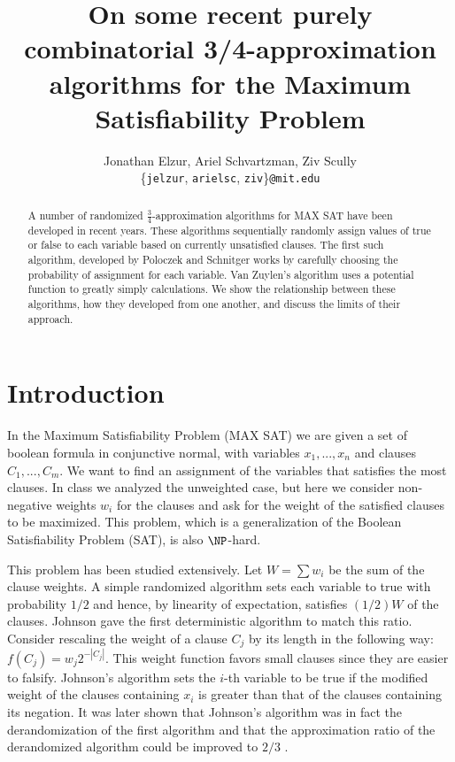 \documentclass[11pt,letter]{article}
\numberwithin{theorem}{section}
\begin{document}

\title{On some recent purely combinatorial 3/4-approximation algorithms for the Maximum Satisfiability Problem}

\author{Jonathan Elzur, Ariel Schvartzman, Ziv Scully \\
  \{\texttt{jelzur}, \texttt{arielsc}, \texttt{ziv}\}\texttt{@mit.edu}}

\maketitle
\begin{abstract}
A number of randomized $\frac{3}{4}$-approximation algorithms for MAX SAT have been developed in recent years. These algorithms sequentially randomly assign values of true or false to each variable based on currently unsatisfied clauses. The first such algorithm, developed by Poloczek and Schnitger \cite{Poloczek:2011:RVJ:2133036.2133087} works by carefully choosing the probability of assignment for each variable. Van Zuylen's algorithm \cite{vanZuylen:2011:SAM:2238496.2238512} uses a potential function to greatly simply calculations. We show the relationship between these algorithms, how they developed from one another, and discuss the limits of their approach.
\end{abstract}

\section{Introduction}

In the Maximum Satisfiability Problem (MAX SAT) we are given a set of boolean formula in conjunctive normal, with
variables $x_1, ..., x_n$ and clauses $C_1,...,C_m$. We want to find an
assignment of the variables that satisfies the most clauses.
In class we analyzed the unweighted case, but here we consider non-negative weights $w_i$ for the clauses
and ask for the weight of the satisfied clauses to be maximized. This problem, which is a generalization of the
Boolean Satisfiability Problem (SAT), is also $\NP$-hard.

This problem has been studied extensively. Let $W = \sum w_i$ be the sum of the clause weights.
A simple randomized algorithm sets each variable to true with probability $1/2$ and hence,
by linearity of expectation, satisfies $(1/2)W$ of the clauses. Johnson \cite{Johnson1974256}
gave the first deterministic algorithm to match this ratio. Consider rescaling the weight of a clause $C_j$
by its length in the following way: $f(C_j) = w_j 2^{-|C_j|}$. This weight function favors small clauses
since they are easier to falsify. Johnson's algorithm sets the $i$-th variable to be true
if the modified weight of the clauses containing $x_i$ is greater than that of the clauses containing its negation.
It was later shown that Johnson's algorithm was in fact the derandomization of the first algorithm and that the
approximation ratio of the derandomized algorithm could be improved to $2/3$ \cite{Chen1999622}.
\end{document}

